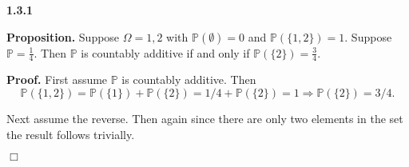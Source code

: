 \documentclass{article}
\begin{document}
\textbf{1.3.1}

\medskip 

\noindent \textbf{Proposition.} Suppose $\Omega = {1,2}$ with $\mathbb{P}(\emptyset) = 0$ and $\mathbb{P}(\{1,2\}) = 1$. Suppose $\mathbb{P} = \frac{1}{4}$. Then $\mathbb{P}$ is countably additive if and only if $\mathbb{P}(\{2\}) = \frac{3}{4}$.  
\bigskip

\noindent \textbf{Proof.} First assume $\mathbb{P}$ is countably additive. Then \[\mathbb{P}(\{1,2\}) = \mathbb{P}(\{1\}) + \mathbb{P}(\{2\}) = 1/4 + \mathbb{P}(\{2\})  = 1 \Rightarrow \mathbb{P}(\{2\}) = 3/4.\]

Next assume the reverse. Then again since there are only two elements in the set the result follows trivially. 


\hfill $\Box$
\end{document}
